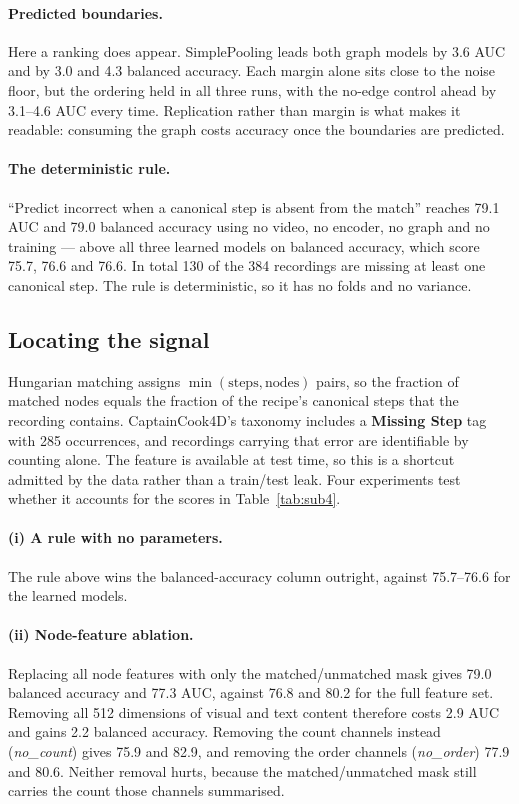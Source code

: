 \documentclass[10pt,twocolumn,letterpaper]{article}
\begin{document}
\paragraph{Predicted boundaries.} Here a ranking does appear. SimplePooling leads
both graph models by 3.6 AUC and by 3.0 and 4.3 balanced accuracy. Each margin
alone sits close to the noise floor, but the ordering held in all three runs, with
the no-edge control ahead by 3.1--4.6 AUC every time. Replication rather than
margin is what makes it readable: consuming the graph costs accuracy once the
boundaries are predicted.

\paragraph{The deterministic rule.} ``Predict incorrect when a canonical step is
absent from the match'' reaches 79.1 AUC and 79.0 balanced accuracy using no video,
no encoder, no graph and no training --- above all three learned models on balanced
accuracy, which score 75.7, 76.6 and 76.6. In total 130 of the 384 recordings are
missing at least one canonical step. The rule is deterministic, so it has no folds
and no variance.

\subsection{Locating the signal}
\label{sec:shortcut}

Hungarian matching assigns $\min(\text{steps},\text{nodes})$ pairs, so the
fraction of matched nodes equals the fraction of the recipe's canonical steps that
the recording contains. CaptainCook4D's taxonomy includes a \textbf{Missing Step}
tag with 285 occurrences, and recordings carrying that error are identifiable by
counting alone. The feature is available at test time, so this is a shortcut
admitted by the data rather than a train/test leak. Four experiments test whether
it accounts for the scores in Table~\ref{tab:sub4}.

\paragraph{(i) A rule with no parameters.} The rule above wins the
balanced-accuracy column outright, against 75.7--76.6 for the learned models.

\paragraph{(ii) Node-feature ablation.} Replacing all node features with only the
matched/unmatched mask gives 79.0 balanced accuracy and 77.3 AUC, against 76.8 and
80.2 for the full feature set. Removing all 512 dimensions of visual and text
content therefore costs 2.9 AUC and gains 2.2 balanced accuracy. Removing the count
channels instead (\emph{no\_count}) gives 75.9 and 82.9, and removing the order
channels (\emph{no\_order}) 77.9 and 80.6. Neither removal hurts, because the
matched/unmatched mask still carries the count those channels summarised.
\end{document}
